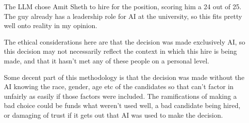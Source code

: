 \documentclass[12pt]{article}
\begin{document}
The LLM chose Amit Sheth to hire for the position, scoring him a 24 out of 25.
The guy already has a leadership role for AI at the university, so this fits pretty
well onto reality in my opinion.

The ethical considerations here are that the decision was made exclusively AI, so this decision
may not necessarily reflect the context in which this hire is being made, and that it hasn't met any of these
people on a personal level.

Some decent part of this methodology is that the decision was made without the AI knowing the race, gender, 
age etc of the candidates so that can't factor in unfairly as easily if those factors were included. 
The ramifications of making a bad choice could be funds what weren't used well, a bad candidate being 
hired, or damaging of trust if it gets out that AI was used to make the decision. 
\end{document}
